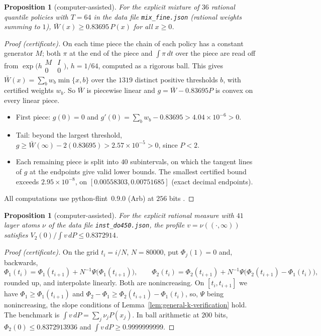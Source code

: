 \documentclass[11pt]{article}
\newtheorem{proposition}[theorem]{Proposition}
\theoremstyle{remark}
\begin{document}
\begin{proposition}[computer-assisted]\label{prop:lowcert}
For the explicit mixture of $36$ rational quantile policies with $T=64$ in the data file \texttt{mix\_fine.json} (rational weights summing to $1$), $\bar W(x)\ge 0.83695\,P(x)$ for all $x\ge0$.
\end{proposition}
\begin{proof}[Proof (certificate)]
On each time piece the chain of each policy has a constant generator $M$; both $\pi$ at the end of the piece and $\int\pi\,dt$ over the piece are read off from $\exp\bigl(h\begin{smallmatrix}M & I\\ 0&0\end{smallmatrix}\bigr)$, $h=1/64$, computed as a rigorous ball. This gives $\bar W(x)=\sum_bw_b\min\{x,b\}$ over the $1319$ distinct positive thresholds $b$, with certified weights $w_b$. So $\bar W$ is piecewise linear and $g=\bar W-0.83695P$ is convex on every linear piece.
\begin{itemize}
\item First piece: $g(0)=0$ and $g'(0)=\sum_bw_b-0.83695>4.04\times10^{-6}>0$.
\item Tail: beyond the largest threshold, $g\ge\bar W(\infty)-2(0.83695)>2.57\times10^{-5}>0$, since $P<2$.
\item Each remaining piece is split into $40$ subintervals, on which the tangent lines of $g$ at the endpoints give valid lower bounds. The smallest certified bound exceeds $2.95\times10^{-8}$, on $[0.00558303,0.00751685]$ (exact decimal endpoints).
\end{itemize}
All computations use python-flint~0.9.0 (Arb) at $256$ bits \cite{Johansson}.
\end{proof}

\begin{proposition}[computer-assisted]\label{prop:upcert}
For the explicit rational measure with $41$ layer atoms $\nu$ of the data file \texttt{inst\_do450.json}, the profile $v=\nu((\cdot,\infty))$ satisfies $V_2(0)/\int v\,dP\le0.8372914$.
\end{proposition}
\begin{proof}[Proof (certificate)]
On the grid $t_i=i/N$, $N=80000$, put $\Phi_{j}(1)=0$ and, backwards,
\[
\Phi_1(t_i)=\Phi_1(t_{i+1})+N^{-1}\Psi\bigl(\Phi_1(t_{i+1})\bigr),\qquad
\Phi_2(t_i)=\Phi_2(t_{i+1})+N^{-1}\Psi\bigl(\Phi_2(t_{i+1})-\Phi_1(t_i)\bigr),
\]
rounded up, and interpolate linearly. Both are nonincreasing. On $[t_i,t_{i+1}]$ we have $\Phi_1\ge\Phi_1(t_{i+1})$ and $\Phi_2-\Phi_1\ge\Phi_2(t_{i+1})-\Phi_1(t_i)$, so, $\Psi$ being nonincreasing, the slope conditions of Lemma~\ref{lem:general-k-verification} hold. The benchmark is $\int v\,dP=\sum_j\nu_jP(x_j)$. In ball arithmetic at $200$ bits, $\Phi_2(0)\le0.8372913936$ and $\int v\,dP\ge0.9999999999$.
\end{proof}
\end{document}
